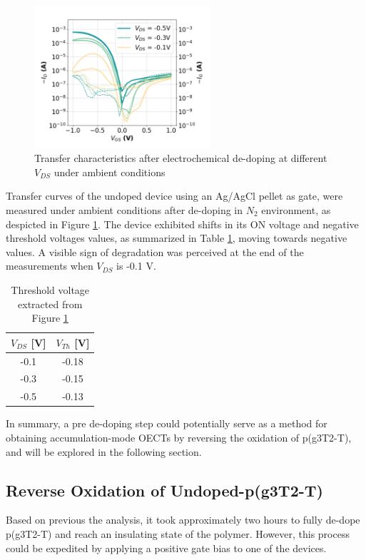 \begin{figure}[ht]
    \centering
    \includegraphics[width=6.5cm]{Images/pdf/revox_transfer_loop2.pdf}%
    \caption[Transfer characteristics after electrochemical de-doping]{Transfer characteristics after electrochemical de-doping at different $V_{DS}$ under ambient conditions}
    \label{fig:transrevox1}
\end{figure}

Transfer curves of the undoped device using an Ag/AgCl pellet as gate, were measured under ambient conditions after de-doping in $N_{2}$ environment, as despicted in Figure \ref{fig:transrevox1}. The device exhibited shifts in its ON voltage and negative threshold voltages values, as summarized in Table \ref{tab:vth_air}, moving towards negative values. A visible sign of degradation was perceived at the end of the measurements when $V_{DS}$ is -0.1 V.

\begin{table}[ht]
\centering
\caption{Threshold voltage extracted from Figure \ref{fig:transrevox1}}
\begin{tabular}{c|c}
 $V_{DS}$ [V] & $V_{Th}$ [V] \\\hline
-0.1 & -0.18 \\
-0.3 & -0.15 \\
-0.5 & -0.13 \\ \hline
\end{tabular}
\label{tab:vth_air}
\end{table}

In summary, a pre de-doping step could potentially serve as a method for obtaining accumulation-mode OECTs by reversing the oxidation of p(g3T2-T), and will be explored in the following section.

\subsection{Reverse Oxidation of Undoped-p(g3T2-T)}
Based on previous the analysis, it took approximately two hours to fully de-dope p(g3T2-T) and reach an insulating state of the polymer. However, this process could be expedited by applying a positive gate bias to one of the devices.

